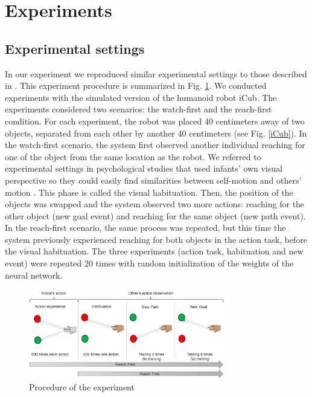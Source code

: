 \documentclass[conference]{IEEEtran}
\begin{document}
\section{Experiments}

\subsection{Experimental settings}
In our experiment we reproduced similar experimental settings to those described in \cite{sommerville2005action}. This experiment procedure is summarized in Fig. \ref{experiment}. We conducted experiments with the simulated version of the humanoid robot iCub. The experiments considered two scenarios: the watch-first and the reach-first condition. For each experiment, the robot was placed 40 centimeters away of two objects, separated from each other by another 40 centimeters (see Fig. \ref{iCub}). In the watch-first scenario, the system first observed another individual reaching for one of the object from the same location as the robot. We referred to experimental settings in psychological studies that used infants' own visual perspective so they could easily find similarities between self-motion and others' motion \cite{woodward1998infants} \cite{sommerville2005action}. This phase is called the visual habituation. Then, the position of the objects was swapped and the system observed two more actions: reaching for the other object (new goal event) and reaching for the same object (new path event). In the reach-first scenario, the same process was repeated, but this time the system previously experienced reaching for both objects in the action task, before the visual habituation. The three experiments (action task, habituation and new event) were repeated 20 times with random initialization of the weights of the neural network.

\begin{figure}
\centering
\includegraphics[width=0.76\textwidth,natwidth=700,natheight=450]{Figure2.png}
\caption{Procedure of the experiment}
\label{experiment}
\end{figure}
\end{document}
